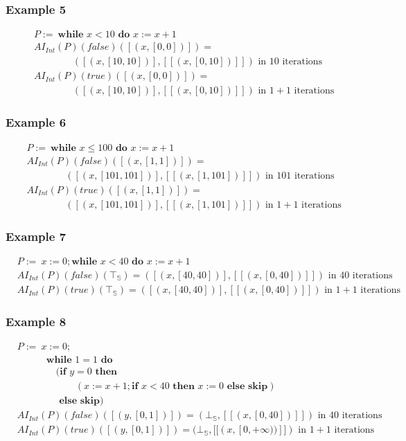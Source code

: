 \documentclass{beamer}
\begin{document}
\begin{frame}
    \frametitle{Example 5}
    \begin{align*}
        &P :=\ \textbf {while } x < 10 \textbf { do } x := x + 1 \\
        &AI_{Int} (P) (false) ([(x, [0, 0])]) =\\
        & \qquad \qquad ([(x, [10, 10])], [[(x, [0, 10])]]) \text{ in $10$ iterations}\\
        &AI_{Int} (P) (true) ([(x, [0, 0])]) =\\
        & \qquad \qquad ([(x, [10, 10])], [[(x, [0, 10])]]) \text{ in $1 + 1$ iterations}
    \end{align*}
\end{frame}

\begin{frame}
    \frametitle{Example 6}
    \begin{align*}
        &P :=\ \textbf {while } x \le 100 \textbf { do } x := x + 1 \\
        &AI_{Int} (P) (false) ([(x, [1, 1])]) =\\
        & \qquad \qquad ([(x, [101, 101])], [[(x, [1, 101])]]) \text{ in $101$ iterations}\\
        &AI_{Int} (P) (true) ([(x, [1, 1])]) =\\
        & \qquad \qquad ([(x, [101, 101])], [[(x, [1, 101])]]) \text{ in $1 + 1$ iterations}
    \end{align*}
\end{frame}

\begin{frame}
    \frametitle{Example 7}
    \begin{align*}
        &P :=\ x := 0; \textbf {while } x < 40 \textbf { do } x := x + 1 \\
        &AI_{Int} (P) (false) (\top_\mathbb{S}) = ([(x, [40, 40])], [[(x, [0, 40])]]) \text{ in $40$ iterations}\\
        &AI_{Int} (P) (true) (\top_\mathbb{S}) = ([(x, [40, 40])], [[(x, [0, 40])]]) \text{ in $1 + 1$ iterations}
    \end{align*}
\end{frame}

\begin{frame}
    \frametitle{Example 8}
    \begin{align*}
        &P :=\ x := 0;\\
        & \qquad \quad     \textbf {while } 1 = 1 \textbf { do } \\
        & \qquad \qquad (\textbf {if } y = 0 \textbf { then } \\
        & \qquad \qquad \qquad (x := x + 1; \textbf {if } x < 40 \textbf { then } x := 0 \textbf { else skip})\\
        & \qquad \qquad \textbf { else skip}) \\
        &AI_{Int} (P) (false) ([(y, [0, 1])]) = (\bot_\mathbb{S}, [[(x, [0, 40])]]) \text{ in $40$ iterations}\\
        &AI_{Int} (P) (true) ([(y, [0, 1])]) = (\bot_\mathbb{S}, [[(x, [0, +\infty))]]) \text{ in $1 + 1$ iterations}
    \end{align*}
\end{frame}
\end{document}
